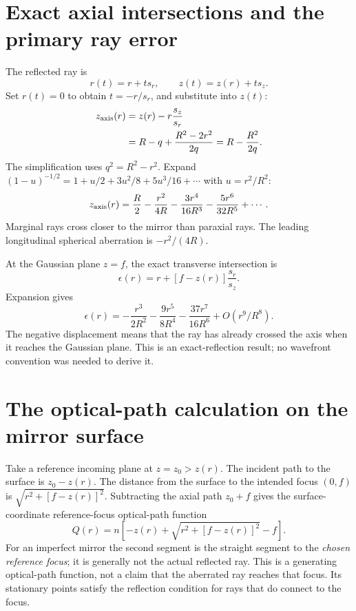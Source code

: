 \section{Exact axial intersections and the primary ray error}
The reflected ray is
\begin{equation}
 r(t)=r+t s_r,\qquad z(t)=z(r)+t s_z.
\end{equation}
Set $r(t)=0$ to obtain $t=-r/s_r$, and substitute into $z(t)$:
\begin{align}
 z_{\rm axis}(r)
 &=z(r)-r\frac{s_z}{s_r}\\
 &=R-q+\frac{R^2-2r^2}{2q}
  =R-\frac{R^2}{2q}.
 \label{ab:sphereaxis}
\end{align}
The simplification uses $q^2=R^2-r^2$. Expand
$(1-u)^{-1/2}=1+u/2+3u^2/8+5u^3/16+\cdots$ with $u=r^2/R^2$:
\begin{equation}
 z_{\rm axis}(r)=\frac R2-\frac{r^2}{4R}
          -\frac{3r^4}{16R^3}-\frac{5r^6}{32R^5}+\cdots.
\end{equation}
Marginal rays cross closer to the mirror than paraxial rays. The leading
longitudinal spherical aberration is $-r^2/(4R)$.

At the Gaussian plane $z=f$, the exact transverse intersection is
\begin{equation}
 \epsilon(r)=r+[f-z(r)]\frac{s_r}{s_z}.
\end{equation}
Expansion gives
\begin{equation}
 \epsilon(r)=-\frac{r^3}{2R^2}-\frac{9r^5}{8R^4}
             -\frac{37r^7}{16R^6}+O(r^9/R^8).
 \label{ab:sphereexactray}
\end{equation}
The negative displacement means that the ray has already crossed the axis
when it reaches the Gaussian plane. This is an exact-reflection result; no
wavefront convention was needed to derive it.

\section{The optical-path calculation on the mirror surface}
Take a reference incoming plane at $z=z_0>z(r)$. The incident path to the
surface is $z_0-z(r)$. The distance from the surface to the intended focus
$(0,f)$ is $\sqrt{r^2+[f-z(r)]^2}$. Subtracting the axial path $z_0+f$ gives
the surface-coordinate reference-focus optical-path function
\begin{equation}
 Q(r)=n\left[-z(r)+\sqrt{r^2+[f-z(r)]^2}-f\right].
 \label{ab:surfaceQ}
\end{equation}
For an imperfect mirror the second segment is the straight segment to the
\emph{chosen reference focus}; it is generally not the actual reflected ray.
This is a generating optical-path function, not a claim that the aberrated
ray reaches that focus. Its stationary points satisfy the reflection
condition for rays that do connect to the focus.

